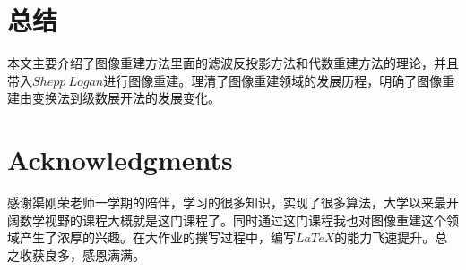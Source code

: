 \documentclass[hyperref]{ctexart}
\begin{document}
	\section{总结}
		本文主要介绍了图像重建方法里面的滤波反投影方法和代数重建方法的理论，并且带入$Shepp\ Logan$进行图像重建。理清了图像重建领域的发展历程，明确了图像重建由变换法到级数展开法的发展变化。
	
	\section*{Acknowledgments}
	 感谢渠刚荣老师一学期的陪伴，学习的很多知识，实现了很多算法，大学以来最开阔数学视野的课程大概就是这门课程了。同时通过这门课程我也对图像重建这个领域产生了浓厚的兴趣。在大作业的撰写过程中，编写$LaTeX$的能力飞速提升。总之收获良多，感恩满满。
	\newpage
\end{document}
